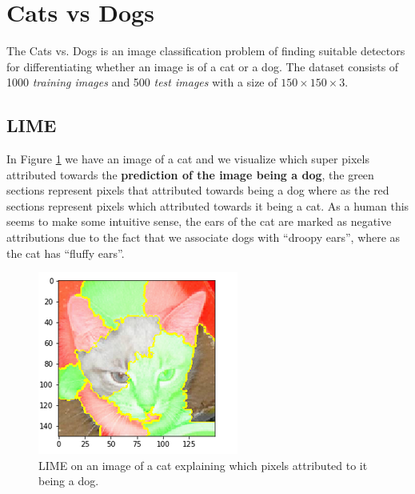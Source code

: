 \section{Cats vs Dogs}

The Cats vs. Dogs is an image classification problem of finding suitable detectors for differentiating whether an image is of a cat or a dog. The dataset consists of 1000 \emph{training images} and  500 \emph{test images} with a size of $150\times150\times3$. 


\subsection{LIME}
 In Figure \ref{fig:lime-cat} we have an image of a cat and we visualize which super pixels attributed towards the \textbf{prediction of the image being a dog}, the green sections represent pixels that attributed towards being a dog where as the red sections represent pixels which attributed towards it being a cat. As a human this seems to make some intuitive sense, the ears of the cat are marked as negative attributions due to the fact that we associate dogs with ``droopy ears'', where as the cat has ``fluffy ears''.
\begin  {figure}[!htpb]
\centering
  \includegraphics[width=0.8\linewidth]{Evaluation_Images/cats_explain.png}
  \caption{LIME on an image of a cat explaining which pixels attributed to it being a dog.}
  \label{fig:lime-cat}
\end{figure}


